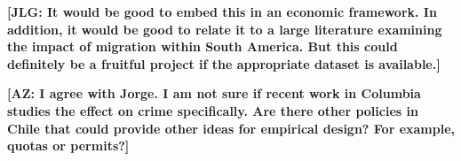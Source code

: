 \bigskip

\noindent \textbf{[JLG: It would be good to embed this in an economic framework. In addition, it would be good to relate it to a large literature examining the impact of migration within South America. But this could definitely be a fruitful project if the appropriate dataset is available.]}

\vspace{3em}

\noindent \textbf{[AZ: I agree with Jorge. I am not sure if recent work in Columbia studies the effect on crime specifically. Are there other policies in Chile that could provide other ideas for empirical design? For example, quotas or permits?]}






